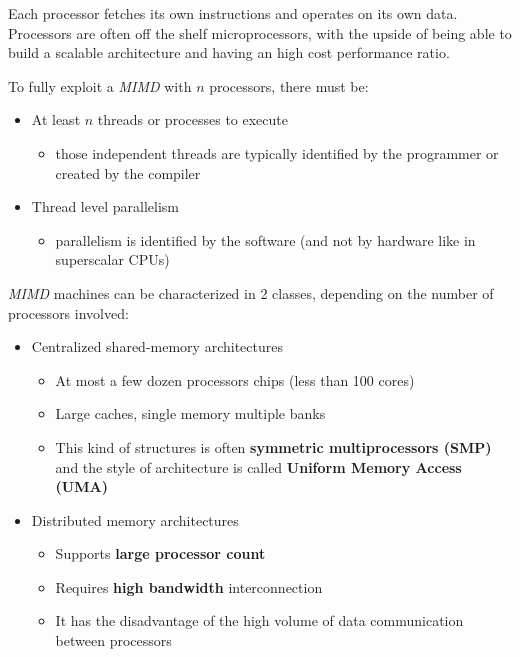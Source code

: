 \documentclass[english]{article}
\begin{document}
Each processor fetches its own instructions and operates on its own data.
Processors are often off the shelf microprocessors, with the upside of being able to build a scalable architecture and having an high cost performance ratio.

To fully exploit a \textit{MIMD} with \(n\) processors, there must be:

\begin{itemize}
  \item At least \(n\) threads or processes to execute
        \begin{itemize}
          \item those independent threads are typically identified by the programmer or created by the compiler
        \end{itemize}
  \item Thread level parallelism
        \begin{itemize}
          \item parallelism is identified by the software (and not by hardware like in superscalar CPUs)
        \end{itemize}
\end{itemize}

\textit{MIMD} machines can be characterized in 2 classes, depending on the number of processors involved:

\begin{itemize}
  \item Centralized shared-memory architectures
        \begin{itemize}
          \item At most a few dozen processors chips (less than 100 cores)
          \item Large caches, single memory multiple banks
          \item This kind of structures is often \textbf{symmetric multiprocessors (SMP)} and the style of architecture is called \textbf{Uniform Memory Access (UMA)}
        \end{itemize}
  \item Distributed memory architectures
        \begin{itemize}
          \item Supports \textbf{large processor count}
          \item Requires \textbf{high bandwidth} interconnection
          \item It has the disadvantage of the high volume of data communication between processors
        \end{itemize}
\end{itemize}
\end{document}
